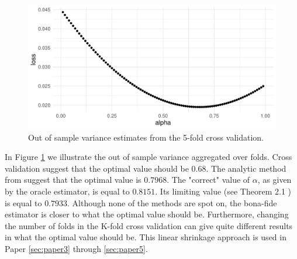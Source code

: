 \documentclass[]{book}\usepackage{knitr}
\begin{document}
\begin{knitrout}
\end{knitrout}

\begin{knitrout}
\color{fgcolor}\begin{figure}

{\centering \includegraphics[width=\maxwidth]{figure/cv_benchmark-1} 

}

\caption[Out of sample variance estimates from the 5-fold cross validation]{Out of sample variance estimates from the 5-fold cross validation.}\label{fig:cv_benchmark}
\end{figure}

\end{knitrout}

In Figure \ref{fig:cv_benchmark} we illustrate the out of sample variance aggregated over folds. 
Cross validation suggest that the optimal value should be $0.68$. 
The analytic method from \citet{bodnar2018estimation} suggest that the optimal value is $0.7968$.
The "correct" value of $\alpha$, as given by the oracle estimator, is equal to $0.8151$. 
Its limiting value (see Theorem 2.1 \citet{bodnar2018estimation}) is equal to $0.7933$.
Although none of the methods are spot on, the bona-fide estimator is closer to what the optimal value should be.
Furthermore, changing the number of folds in the K-fold cross validation can give quite different results in what the optimal value should be.
This linear shrinkage approach is used in Paper \ref{sec:paper3} through \ref{sec:paper5}.
\end{document}
